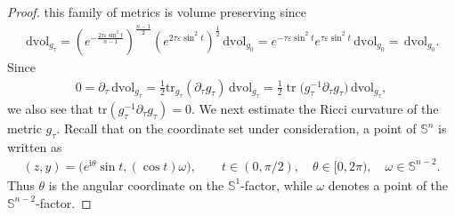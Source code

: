 \documentclass[11pt,reqno]{amsart}
\numberwithin{equation}{section}
\theoremstyle{definition}
\theoremstyle{remark}
\newcommand{\iii}{\mathrm i}
\newcommand{\ta}{\tau}
\newcommand{\tr}{\textrm{tr}}
\newcommand{\ud}{\mathrm{d}}
\newcommand{\0}{\emptyset}
\newcommand{\veps}{\varepsilon}
\newcommand{\bbS}{\mathbb S}
\newcommand{\dvol}{\,\mathrm{dvol}}
\begin{document}
\begin{proof}
this family of metrics is volume preserving since
\begin{align}
        \dvol_{g_\ta}
        =
        \left(
        e^{-\frac{2\ta\veps\sin^2t}{n-1}}
        \right)^{\frac{n-1}{2}}
        \left(
        e^{2\ta\veps\sin^2t}
        \right)^{\frac12}
        \dvol_{g_0}
        =
        e^{-\ta\veps\sin^2t}
        e^{\ta\veps\sin^2t}
        \dvol_{g_0}
        =
        \dvol_{g_0}.
        \label{eq:gaussian-split-volume-preserving}
\end{align}
Since
\begin{align}
        0=\partial_\tau \dvol_{g_\ta}=\frac{1}{2}\tr_{g_\ta} (\partial_\ta g_\ta) \dvol_{g_\ta}
        =
        \frac12\operatorname{tr}
        \bigl(g_\ta^{-1}\partial_\ta g_\ta\bigr)\dvol_{g_\ta},
\end{align}
we also see that $\tr(g_\ta^{-1}\partial_\ta g_\ta)=0.$ We next estimate the Ricci curvature of the metric $g_\ta$. Recall that on the
coordinate set under consideration, a point of $\bbS^n$ is written as
\begin{align}
        (z,y)
        =
        \bigl(e^{\iii\theta}\sin t,(\cos t)\omega\bigr),
        \qquad
        t\in(0,\pi/2),
        \quad
        \theta\in [0,2\pi),
        \quad
        \omega\in\bbS^{n-2}.
\end{align}
Thus $\theta$ is the angular coordinate on the $\bbS^1$-factor, while
$\omega$ denotes a point of the $\bbS^{n-2}$-factor.


\end{proof}
\end{document}
